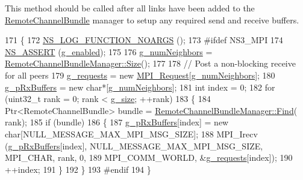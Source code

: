 This method should be called after all links have been added to the \hyperlink{classns3_1_1RemoteChannelBundle}{Remote\+Channel\+Bundle} manager to setup any required send and receive buffers. 
\begin{DoxyCode}
171 \{
172   \hyperlink{log-macros-disabled_8h_a8f7e4afc291c9d29a65c18ac1f79197b}{NS\_LOG\_FUNCTION\_NOARGS} ();
173 \textcolor{preprocessor}{#ifdef NS3\_MPI}
174   \hyperlink{assert_8h_a6dccdb0de9b252f60088ce281c49d052}{NS\_ASSERT} (\hyperlink{classns3_1_1NullMessageMpiInterface_ab4002d79e5319aae80e5bc39251ba609}{g\_enabled});
175 
176   \hyperlink{classns3_1_1NullMessageMpiInterface_afb1c81a47bce9a9b80fea71c80a66ef9}{g\_numNeighbors} = \hyperlink{classns3_1_1RemoteChannelBundleManager_aaf679dae2468048f39ee77ec6b41db64}{RemoteChannelBundleManager::Size}();
177 
178   \textcolor{comment}{// Post a non-blocking receive for all peers}
179   \hyperlink{classns3_1_1NullMessageMpiInterface_a8a48f62af92d9d68b83296c0a3ddbb3f}{g\_requests} = \textcolor{keyword}{new} \hyperlink{granted-time-window-mpi-interface_8h_a31b372fd1cca939295900acb2a4961dd}{MPI\_Request}[\hyperlink{classns3_1_1NullMessageMpiInterface_afb1c81a47bce9a9b80fea71c80a66ef9}{g\_numNeighbors}];
180   \hyperlink{classns3_1_1NullMessageMpiInterface_ab6aaed51bb851d090273d5c44fe2aec0}{g\_pRxBuffers} = \textcolor{keyword}{new} \textcolor{keywordtype}{char}*[\hyperlink{classns3_1_1NullMessageMpiInterface_afb1c81a47bce9a9b80fea71c80a66ef9}{g\_numNeighbors}];
181   \textcolor{keywordtype}{int} index = 0;
182   \textcolor{keywordflow}{for} (uint32\_t rank = 0; rank < \hyperlink{classns3_1_1NullMessageMpiInterface_acbc2b4d714259601b86e1bc1bc13e26a}{g\_size}; ++rank)
183     \{
184       Ptr<RemoteChannelBundle> bundle = \hyperlink{classns3_1_1RemoteChannelBundleManager_a143cfdce189ed68cc0917255ef0b849f}{RemoteChannelBundleManager::Find}(
      rank);
185       \textcolor{keywordflow}{if} (bundle) 
186         \{
187           \hyperlink{classns3_1_1NullMessageMpiInterface_ab6aaed51bb851d090273d5c44fe2aec0}{g\_pRxBuffers}[index] = \textcolor{keyword}{new} \textcolor{keywordtype}{char}[NULL\_MESSAGE\_MAX\_MPI\_MSG\_SIZE];
188           MPI\_Irecv (\hyperlink{classns3_1_1NullMessageMpiInterface_ab6aaed51bb851d090273d5c44fe2aec0}{g\_pRxBuffers}[index], NULL\_MESSAGE\_MAX\_MPI\_MSG\_SIZE, MPI\_CHAR, rank, 0,
189                      MPI\_COMM\_WORLD, &\hyperlink{classns3_1_1NullMessageMpiInterface_a8a48f62af92d9d68b83296c0a3ddbb3f}{g\_requests}[index]);
190           ++index;
191         \}
192     \}
193 \textcolor{preprocessor}{#endif}
194 \}
\end{DoxyCode}


